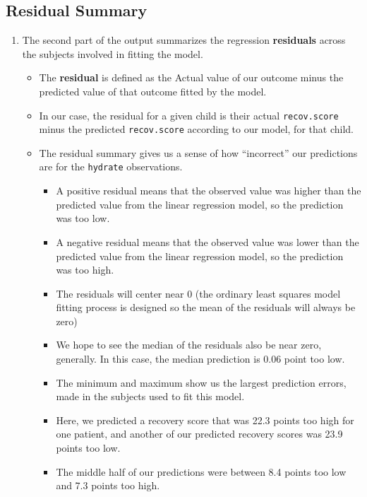 \documentclass[
]{book}
\providecommand{\tightlist}{%
  \setlength{\itemsep}{0pt}\setlength{\parskip}{0pt}}
\begin{document}
\hypertarget{residual-summary}{%
\subsection{Residual Summary}\label{residual-summary}}

\begin{enumerate}
\def\labelenumi{\arabic{enumi}.}
\setcounter{enumi}{1}
\tightlist
\item
  The second part of the output summarizes the regression \textbf{residuals} across the subjects involved in fitting the model.

  \begin{itemize}
  \tightlist
  \item
    The \textbf{residual} is defined as the Actual value of our outcome minus the predicted value of that outcome fitted by the model.
  \item
    In our case, the residual for a given child is their actual \texttt{recov.score} minus the predicted \texttt{recov.score} according to our model, for that child.
  \item
    The residual summary gives us a sense of how ``incorrect'' our predictions are for the \texttt{hydrate} observations.

    \begin{itemize}
    \tightlist
    \item
      A positive residual means that the observed value was higher than the predicted value from the linear regression model, so the prediction was too low.
    \item
      A negative residual means that the observed value was lower than the predicted value from the linear regression model, so the prediction was too high.
    \item
      The residuals will center near 0 (the ordinary least squares model fitting process is designed so the mean of the residuals will always be zero)
    \item
      We hope to see the median of the residuals also be near zero, generally. In this case, the median prediction is 0.06 point too low.
    \item
      The minimum and maximum show us the largest prediction errors, made in the subjects used to fit this model.
    \item
      Here, we predicted a recovery score that was 22.3 points too high for one patient, and another of our predicted recovery scores was 23.9 points too low.
    \item
      The middle half of our predictions were between 8.4 points too low and 7.3 points too high.
    \end{itemize}
  \end{itemize}
\end{enumerate}
\end{document}
